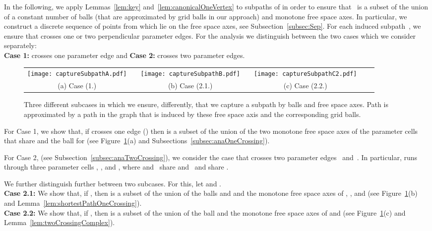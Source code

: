 \documentclass[a4paper,11pt]{article}
\begin{document}
In the following, we apply Lemmas~\ref{lem:key} and~\ref{lem:canonicalOneVertex} to subpaths  of  in order to ensure that~ is a subset of the union of a constant number of balls (that are approximated by grid balls in our approach) and monotone free space axes. In particular, we construct a discrete sequence of points from  which lie on the free space axes, see Subsection~\ref{subsec:Sep}. 
For each induced subpath~, we ensure that  crosses one or two perpendicular parameter edges. For the analysis we distinguish between the two cases which we consider separately:\\
{\bf Case 1:}  crosses one parameter edge and 
{\bf Case 2:}  crosses two parameter edges.

	
\begin{figure}[ht]
  \begin{center}
    \begin{tabular}{ccccccc}
       \texttt{[image: captureSubpathA.pdf]} & &
       \texttt{[image: captureSubpathB.pdf]} & &
       \texttt{[image: captureSubpathC2.pdf]}&&\\ 
      {\small (a) Case (1.)} & &
      {\small (b) Case (2.1.)}&&
      {\small (c) Case (2.2.)}\\
\end{tabular}
  \end{center}
  \vspace*{-12pt}
  \caption{Three different subcases in which we  ensure, differently, that we capture a subpath  by balls and free space axes. Path  is approximated by a path  in the graph that is induced by these free space axis and the corresponding grid balls.}
  \label{fig:captureTheSubpath}
\end{figure}
	
    For Case 1, we show that, if  crosses one edge () then  is a subset of the union of the two monotone free space axes of the parameter cells that share  and the ball  for   (see Figure~\ref{fig:captureTheSubpath}(a) and Subsections~\ref{subsec:anaOneCrossing}).
	
	For Case 2,  (see Subsection~\ref{subsec:anaTwoCrossing}), we consider the case that  crosses two parameter edges~ and~. In particular,  runs through three parameter cells , , and , where  and~ share  and~ and  share . 
	
	We further distinguish further between two subcases. For this, let  and . \\
{\bf Case 2.1:}  We show that, if , then  is a subset of the union of the balls  and  and the monotone free space axes of , , and  (see Figure~\ref{fig:captureTheSubpath}(b) and Lemma~\ref{lem:shortestPathOneCrossing}).\\ 
{\bf Case 2.2:} We show that, if , then  is a subset of the union of the ball  and the monotone free space axes of  and  (see Figure~\ref{fig:captureTheSubpath}(c) and Lemma~\ref{lem:twoCrossingComplex}).
	
\end{document}
